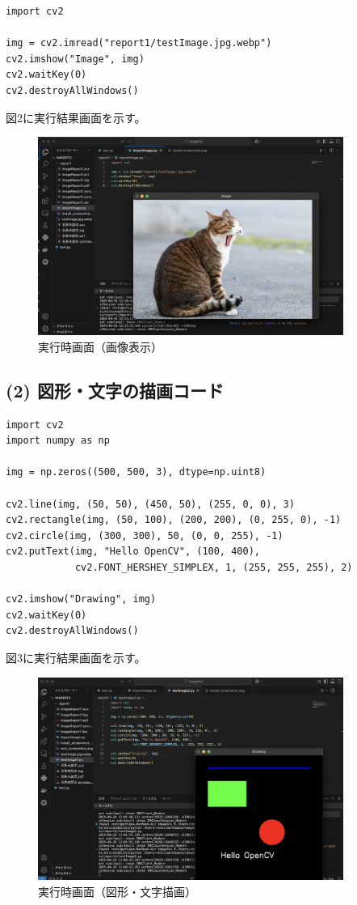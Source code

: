 \documentclass[a4paper,11pt,titlepage]{jsarticle}
\begin{document}
\begin{lstlisting}[caption=画像表示のコード]
import cv2

img = cv2.imread("report1/testImage.jpg.webp")
cv2.imshow("Image", img)
cv2.waitKey(0)
cv2.destroyAllWindows()
\end{lstlisting}

図2に実行結果画面を示す。

\begin{figure}[H]
    \centering
    \includegraphics[width=10cm]{test_screenshot.png}
    \caption{実行時画面（画像表示）}
\end{figure}

\subsection*{(2) 図形・文字の描画コード}

\begin{lstlisting}[caption=図形・文字の描画コード]
import cv2
import numpy as np

img = np.zeros((500, 500, 3), dtype=np.uint8)

cv2.line(img, (50, 50), (450, 50), (255, 0, 0), 3)
cv2.rectangle(img, (50, 100), (200, 200), (0, 255, 0), -1)
cv2.circle(img, (300, 300), 50, (0, 0, 255), -1)
cv2.putText(img, "Hello OpenCV", (100, 400),
            cv2.FONT_HERSHEY_SIMPLEX, 1, (255, 255, 255), 2)

cv2.imshow("Drawing", img)
cv2.waitKey(0)
cv2.destroyAllWindows()
\end{lstlisting}

図3に実行結果画面を示す。

\begin{figure}[H]
    \centering
    \includegraphics[width=10cm]{test_screenshot2.png}
    \caption{実行時画面（図形・文字描画）}
\end{figure}
\end{document}
